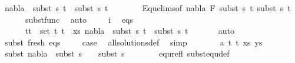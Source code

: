 \begin{isabellebody}
\ {\isachardoublequoteopen}nabla{}\ {\isasymturnstile}\ subst\ s{}\ t{}\ {\isasymapprox}\ subst\ s{}\ t{}{\isachardoublequoteclose}\ \isanewline
\ \ \ \ \ \isamarkupfalse%
\ Equ{\isacharunderscore}{\kern0pt}elims{\isacharparenleft}{\kern0pt}{}{\isacharparenright}{\kern0pt}{\isacharbrackleft}{\kern0pt}of\ nabla{}\ F\ {\isacartoucheopen}subst\ s{}\ t{}{\isacartoucheclose}\ {\isacartoucheopen}subst\ s{}\ t{}{\isacartoucheclose}{\isacharbrackright}{\kern0pt}\ \isanewline
\ \ \ \ \ \ subst{\isacharunderscore}{\kern0pt}func\ \isamarkupfalse%
\ auto\isanewline
\ \ \ \isamarkupfalse%
\ i\ \isamarkupfalse%
\ eqs{\isacharcolon}{\kern0pt}\ \isanewline
\ \ \ \ \ {\isachardoublequoteopen}{\isasymforall}\ {\isacharparenleft}{\kern0pt}t{}{\isacharcomma}{\kern0pt}t{}{\isacharparenright}{\kern0pt}\ {\isasymin}\ set\ {\isacharparenleft}{\kern0pt}{\isacharparenleft}{\kern0pt}t{}{\isacharcomma}{\kern0pt}\ t{}{\isacharparenright}{\kern0pt}\ {\isacharhash}{\kern0pt}\ xs{\isacharparenright}{\kern0pt}{\isachardot}{\kern0pt}\ nabla{}\ {\isasymturnstile}\ subst\ s{}\ t{}\ {\isasymapprox}\ subst\ s{}\ t{}{\isachardoublequoteclose}\isanewline
\ \ \ \ \ \isamarkupfalse%
\ auto\isanewline
\isanewline
\ \ \ \isamarkupfalse%
\ subst\ fresh\ eqs\isanewline
\ \ \ \isamarkupfalse%
\ {\isacharquery}{\kern0pt}case\ \isamarkupfalse%
\ all{\isacharunderscore}{\kern0pt}solutions{\isacharunderscore}{\kern0pt}def\ \isamarkupfalse%
\ simp\isanewline
\ \isamarkupfalse%
\isanewline
\ \ \ \isamarkupfalse%
\ {\isacharparenleft}{\kern0pt}{}\ a\ t{}\ t{}\ xs\ ys{\isacharparenright}{\kern0pt}\isanewline
\ \ \ \isamarkupfalse%
\ \isamarkupfalse%
\ subst{\isacharcolon}{\kern0pt}\ {\isachardoublequoteopen}nabla{}\ {\isasymTurnstile}\ subst\ {\isacharparenleft}{\kern0pt}s{}\ {\isasymbullet}\ {\isacharbrackleft}{\kern0pt}{\isacharbrackright}{\kern0pt}{\isacharparenright}{\kern0pt}\ {\isasymapprox}\ subst\ s{}{\isachardoublequoteclose}\ \isanewline
\ \ \ \ \ \isamarkupfalse%
\ equ{\isacharunderscore}{\kern0pt}refl\ subst{\isacharunderscore}{\kern0pt}equ{\isacharunderscore}{\kern0pt}def\ \isamarkupfalse%

\end{isabellebody}
